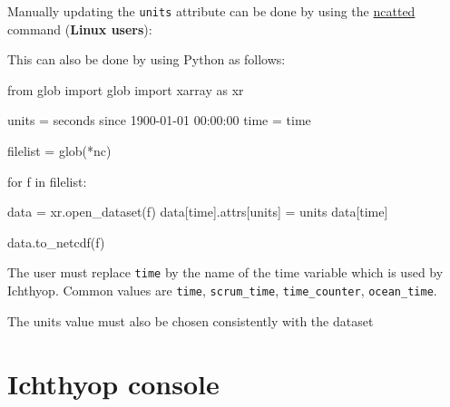 \documentclass[
  letterpaper,
  DIV=11,
  numbers=noendperiod]{scrreprt}
\newenvironment{Shaded}{\begin{snugshade}}{\end{snugshade}}
\newcommand{\AttributeTok}[1]{\textcolor[rgb]{0.40,0.45,0.13}{#1}}
\newcommand{\CommentTok}[1]{\textcolor[rgb]{0.37,0.37,0.37}{#1}}
\newcommand{\ControlFlowTok}[1]{\textcolor[rgb]{0.00,0.23,0.31}{#1}}
\newcommand{\ExtensionTok}[1]{\textcolor[rgb]{0.00,0.23,0.31}{#1}}
\newcommand{\ImportTok}[1]{\textcolor[rgb]{0.00,0.46,0.62}{#1}}
\newcommand{\KeywordTok}[1]{\textcolor[rgb]{0.00,0.23,0.31}{#1}}
\newcommand{\NormalTok}[1]{\textcolor[rgb]{0.00,0.23,0.31}{#1}}
\newcommand{\OperatorTok}[1]{\textcolor[rgb]{0.37,0.37,0.37}{#1}}
\newcommand{\PreprocessorTok}[1]{\textcolor[rgb]{0.68,0.00,0.00}{#1}}
\newcommand{\StringTok}[1]{\textcolor[rgb]{0.13,0.47,0.30}{#1}}
\newcommand{\VariableTok}[1]{\textcolor[rgb]{0.07,0.07,0.07}{#1}}
\begin{document}
Manually updating the \texttt{units} attribute can be done by using the
\href{https://linux.die.net/man/1/ncatted}{ncatted} command
(\textbf{Linux users}):

\begin{Shaded}
\end{Shaded}

This can also be done by using Python as follows:

\begin{Shaded}
\begin{Highlighting}[]
\ImportTok{from}\NormalTok{ glob }\ImportTok{import}\NormalTok{ glob}
\ImportTok{import}\NormalTok{ xarray }\ImportTok{as}\NormalTok{ xr}

\NormalTok{units }\OperatorTok{=} \StringTok{\textquotesingle{}seconds since 1900{-}01{-}01 00:00:00\textquotesingle{}}
\NormalTok{time }\OperatorTok{=} \StringTok{\textquotesingle{}time\textquotesingle{}}

\NormalTok{filelist }\OperatorTok{=}\NormalTok{ glob(}\StringTok{\textquotesingle{}*nc\textquotesingle{}}\NormalTok{)}

\ControlFlowTok{for}\NormalTok{ f }\KeywordTok{in}\NormalTok{ filelist:}

\NormalTok{    data }\OperatorTok{=}\NormalTok{ xr.open\_dataset(f)}
\NormalTok{    data[time].attrs[}\StringTok{\textquotesingle{}units\textquotesingle{}}\NormalTok{] }\OperatorTok{=}\NormalTok{ units}
\NormalTok{    data[time]}

\NormalTok{    data.to\_netcdf(f)}
\end{Highlighting}
\end{Shaded}

The user must replace \texttt{time} by the name of the time variable
which is used by Ichthyop. Common values are \texttt{time},
\texttt{scrum\_time}, \texttt{time\_counter}, \texttt{ocean\_time}.

The units value must also be chosen consistently with the dataset


\chapter{Ichthyop console}\label{sec-console}
\end{document}
